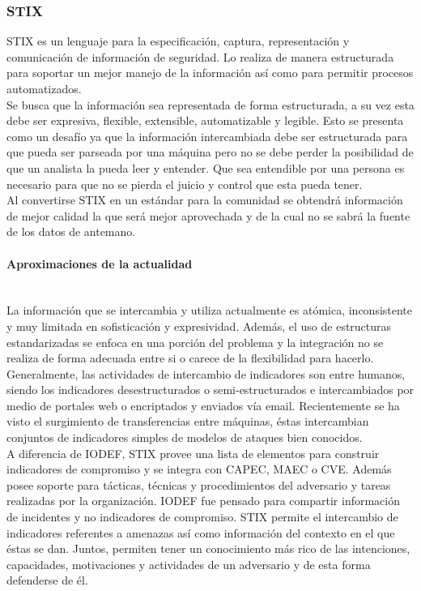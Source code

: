 \subsubsection{STIX}

STIX es un lenguaje para la especificación, captura, representación y 
comunicación de información de seguridad. Lo realiza de manera 
estructurada para soportar un mejor manejo de la información así como para 
permitir procesos automatizados.\\

Se busca que la información sea representada de forma estructurada, a su vez 
esta debe ser expresiva, flexible, extensible, automatizable y legible. Esto se 
presenta como un desafío ya que la información intercambiada debe ser 
estructurada para que pueda ser parseada por una máquina pero no se debe perder 
la posibilidad de que un analista la pueda leer y entender. Que sea entendible 
por una persona es necesario para que no se pierda el juicio y control que esta 
pueda tener.\\

Al convertirse STIX en un estándar para la comunidad se obtendrá información de 
mejor calidad la que será mejor aprovechada y de la cual no se sabrá la fuente 
de los datos de antemano.

\paragraph{Aproximaciones de la actualidad}\ \\

La información que se intercambia y utiliza actualmente es atómica, inconsistente 
y muy limitada en sofisticación y expresividad. Además, el uso de estructuras 
estandarizadas se enfoca en una porción del problema y la integración no se 
realiza de forma adecuada entre si o carece de la flexibilidad para hacerlo. 
Generalmente, las actividades de intercambio de indicadores son entre humanos, 
siendo los indicadores desestructurados o semi-estructurados e intercambiados 
por medio de portales web o encriptados y enviados vía email. Recientemente se 
ha visto el surgimiento de transferencias entre máquinas, éstas intercambian 
conjuntos de indicadores simples de modelos de ataques bien conocidos.\\

A diferencia de IODEF, STIX provee una lista de elementos para construir 
indicadores de compromiso y se integra con CAPEC, MAEC o CVE. Además posee 
soporte para tácticas, técnicas y procedimientos del adversario y tareas 
realizadas por la organización. IODEF fue pensado para compartir información de 
incidentes y no indicadores de compromiso. STIX permite el intercambio de 
indicadores referentes a amenazas así como información del contexto en el que 
éstas se dan. Juntos, permiten tener un conocimiento más rico de las 
intenciones, capacidades, motivaciones y actividades de un adversario y de esta 
forma defenderse de él.\\

